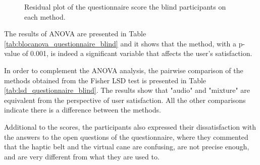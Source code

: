 \begin{figure}[!thb]
\begin{minipage}{0.45\textwidth}
        \caption{Residual plot of the questionnaire score the blind participants on each method.}
        \label{fig:residplot_questionnaire_blind}
    \end{minipage}
\end{figure}

The results of ANOVA are presented in Table  \ref{tab:blocanova_questionnaire_blind} and it shows that the method, with a p-value of 0.001, is indeed a significant variable that affects the user's satisfaction.



In order to complement the ANOVA analysis, the pairwise comparison of the methods obtained from the Fisher LSD test is presented in Table \ref{tab:lsd_questionnaire_blind}. The results show that "audio" and "mixture" are equivalent from the perspective of user satisfaction. All the other comparisons indicate there is a difference between the methods.



Additional to the scores, the participants also expressed their dissatisfaction with the answers to the open questions of the questionnaire, where they commented that the haptic belt and the virtual cane are confusing, are not precise enough, and are very different from what they are used to.

\FloatBarrier